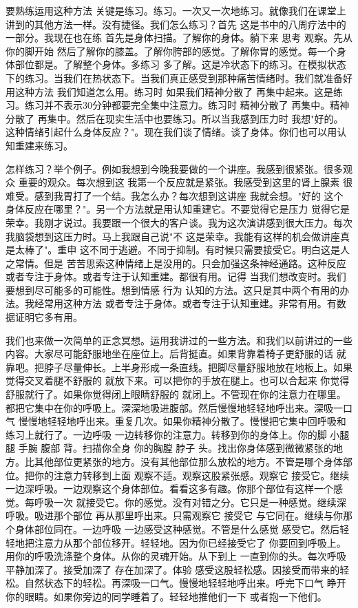 要熟练运用这种方法 关键是练习。练习。一次又一次地练习。就像我们在课堂上讲到的其他方法一样。没有捷径。我们怎么练习？首先 这是书中的八周疗法中的一部分。我现在也在练 首先是身体扫描。了解你的身体。躺下来 思考 观察。先从你的脚开始 然后了解你的膝盖。了解你胯部的感觉。了解你胃的感觉。每一个身体部位都是。了解整个身体。多练习 多了解。这是冷状态下的练习。在模拟状态下的练习。当我们在热状态下。当我们真正感受到那种痛苦情绪时。我们就准备好用这种方法 我们知道怎么用。练习时 如果我们精神分散了 再集中起来。这是练习。练习并不表示30分钟都要完全集中注意力。练习时 精神分散了 再集中。精神分散了 再集中。然后在现实生活中也要练习。所以当我感到压力时 我想"好的。这种情绪引起什么身体反应？"。现在我们谈了情绪。谈了身体。你们也可以用认知重建来练习。 

怎样练习？举个例子。例如我想到今晚我要做的一个讲座。我感到很紧张。很多观众 重要的观众。每次想到这 我第一个反应就是紧张。我感受到这里的肾上腺素 很难受。感到我胃打了一个结。我怎么办？每次想到这讲座 我就会想。"好的 这个身体反应在哪里？"。另一个方法就是用认知重建它。不要觉得它是压力 觉得它是荣幸。我刚才说过。我要跟一个很大的客户谈。我为这次演讲感到很大压力。每次我脑袋想到这压力时。马上我跟自己说"不 这是荣幸。我能有这样的机会做讲座真是太棒了"。重申 这不同于逃避。不同于抑制。有时候只需要接受它。明白这是人之常情。但是 苦苦思索这种情绪上是没用的。只会加强这条神经通路。这种反应 或者专注于身体。或者专注于认知重建。都很有用。记得 当我们想改变时。我们要想到尽可能多的可能性。想到情感 行为 认知的方法。这只是其中两个有用的办法。我经常用这种方法 或者专注于身体。或者专注于认知重建。非常有用。有数据证明它多有用。 

我们也来做一次简单的正念冥想。运用我讲过的一些方法。和我们以前讲过的一些内容。大家尽可能舒服地坐在座位上。后背挺直。如果背靠着椅子更舒服的话 就靠吧。把脖子尽量伸长。上半身形成一条直线。把脚尽量舒服地放在地板上。如果觉得交叉着腿不舒服的 就放下来。可以把你的手放在腿上。也可以合起来 你觉得舒服就行了。如果你觉得闭上眼睛舒服的 就闭上。不管现在你的注意力在哪里。都把它集中在你的呼吸上。深深地吸进腹部。然后慢慢地轻轻地呼出来。深吸一口气 慢慢地轻轻地呼出来。重复几次。如果你精神分散了。慢慢把它集中回呼吸和练习上就行了。一边呼吸 一边转移你的注意力。转移到你的身体上。你的脚 小腿 腿 手腕 腹部 背。扫描你全身 你的胸膛 脖子 头。找出你身体感到微微紧张的地方。比其他部位更紧张的地方。没有其他部位那么放松的地方。不管是哪个身体部位。把你的注意力转移到上面 观察不适。观察这股紧张感。观察它 接受它。继续一边深呼吸。一边观察这个身体部位。看看这多有趣。你那个部位有这样一个感觉。每呼吸一次 就接受它。你的感觉。没有对错之分。它只是一种感觉。继续深呼吸。吸进那个部位 再从那里呼出来。只需观察它 接受它 与它同在。继续与你那个身体部位同在。一边呼吸 一边感受这种感觉。不管是什么感觉 感受它。然后轻轻地把注意力从那个部位移开。轻轻地。因为你已经接受它了 你要回到呼吸上。用你的呼吸洗涤整个身体。从你的灵魂开始。从下到上 一直到你的头。每次呼吸 平静加深了。接受加深了 存在加深了。体验 感受这股轻松感。因接受而带来的轻松。自然状态下的轻松。再深吸一口气。慢慢地轻轻地呼出来。呼完下口气 睁开你的眼睛。如果你旁边的同学睡着了。轻轻地推他们一下 或者抱一下他们。 

